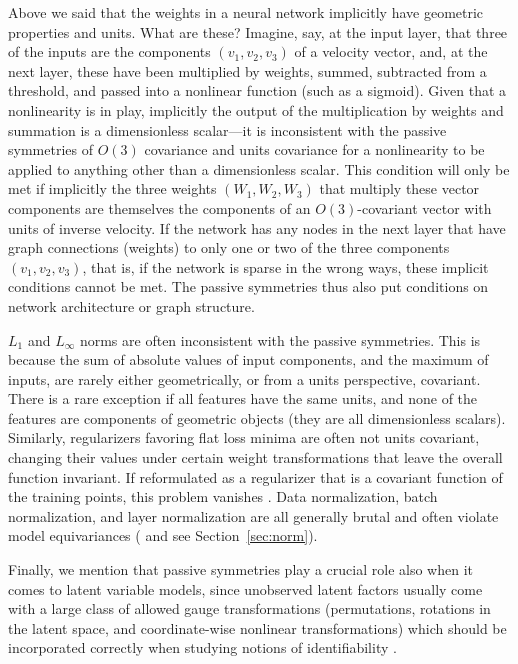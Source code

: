 \documentclass[accepted]{article}
\newcommand{\sectionname}{Section}
\newcommand{\secref}[1]{\sectionname~\ref{#1}}
\begin{document}
Above we said that the weights in a neural network implicitly have geometric properties and units.
What are these?
Imagine, say, at the input layer, that three of the inputs are the components $(v_1, v_2, v_3)$ of a velocity vector, and, at the next layer, these have been multiplied by weights, summed, subtracted from a threshold, and passed into a nonlinear function (such as a sigmoid).
Given that a nonlinearity is in play, implicitly the output of the multiplication by weights and summation is a dimensionless scalar---it is inconsistent with the passive symmetries of $O(3)$ covariance and units covariance for a nonlinearity to be applied to anything other than a dimensionless scalar.
This condition will only be met if implicitly the three weights $(W_1, W_2, W_3)$ that multiply these vector components are themselves the components of an $O(3)$-covariant vector with units of inverse velocity.
If the network has any nodes in the next layer that have graph connections (weights) to only one or two of the three components $(v_1, v_2, v_3)$, that is, if the network is sparse in the wrong ways, these implicit conditions cannot be met.
The passive symmetries thus also put conditions on network architecture or graph structure.

$L_1$ and $L_\infty$ norms are often inconsistent with the passive symmetries.
This is because the sum of absolute values of input components, and the maximum of inputs, are rarely either geometrically, or from a units perspective, covariant.
There is a rare exception if all features have the same units, and none of the features are components of geometric objects (they are all dimensionless scalars).
Similarly, regularizers favoring flat loss minima \citep{flatminima,sharpminima,petzka2021relative} are often not units covariant, changing their values under certain weight transformations that leave the overall function invariant. 
If reformulated as a regularizer that is a covariant function of the training points, this problem vanishes \citep{LuxburgBS04}.
Data normalization, batch normalization, and layer normalization are all generally brutal and often violate model equivariances (\citealt{aalto2022geometric} and see \secref{sec:norm}).

Finally, we mention that passive symmetries play a crucial role also when it comes to latent variable models, since unobserved latent factors usually come with a large class of allowed gauge transformations (permutations, rotations in the latent space, and coordinate-wise nonlinear transformations) which should be incorporated correctly when studying notions of identifiability \citep{khemakhem2020ice, BucBesSch22}.
\end{document}

